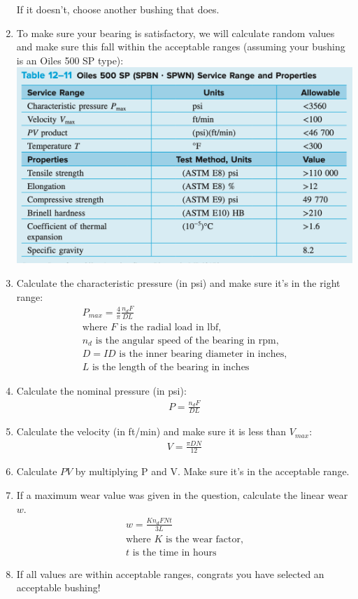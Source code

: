 \documentclass[11pt, fleqn]{article}
\begin{document}
\begin{enumerate}
    If it doesn't, choose another bushing that does.
    \item To make sure your bearing is satisfactory, we will calculate random values and make sure this fall within the acceptable ranges (assuming your bushing is an Oiles 500 SP type):\\
    \includegraphics[scale=0.6]{Bearings/oiles-500-service-ranges.png}
    \item Calculate the characteristic pressure (in psi) and make sure it's in the right range:
    \begin{align*}
        P_{max} = \frac{4}{\pi}\frac{n_dF}{DL}\\
        \text{where $F$ is the radial load in lbf,}\\
        \text{$n_d$ is the angular speed of the bearing in rpm,}\\
        \text{$D = ID$ is the inner bearing diameter in inches,}\\
        \text{$L$ is the length of the bearing in inches}
    \end{align*}
    \item Calculate the nominal pressure (in psi):
    \begin{align*}
        P=\frac{n_dF}{DL}
    \end{align*}
    \item Calculate the velocity (in ft/min) and make sure it is less than $V_{max}$:
    \begin{align*}
         V=\frac{\pi DN}{12}
    \end{align*}
    \item Calculate $PV$ by multiplying P and V. Make sure it's in the acceptable range.
    \item If a maximum wear value was given in the question, calculate the linear wear $w$.
    \begin{align*}
        w = \frac{Kn_dFNt}{3L}\\
        \text{where $K$ is the wear factor,}\\
        \text{$t$ is the time in hours}
    \end{align*}
    \item If all values are within acceptable ranges, congrats you have selected an acceptable bushing!
\end{enumerate}
\end{document}
